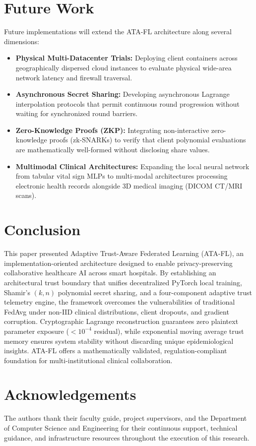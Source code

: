\documentclass[conference]{IEEEtran}
\begin{document}
\section{Future Work}
Future implementations will extend the ATA-FL architecture along several dimensions:
\begin{itemize}
    \item \textbf{Physical Multi-Datacenter Trials:} Deploying client containers across geographically dispersed cloud instances to evaluate physical wide-area network latency and firewall traversal.
    \item \textbf{Asynchronous Secret Sharing:} Developing asynchronous Lagrange interpolation protocols that permit continuous round progression without waiting for synchronized round barriers.
    \item \textbf{Zero-Knowledge Proofs (ZKP):} Integrating non-interactive zero-knowledge proofs (zk-SNARKs) to verify that client polynomial evaluations are mathematically well-formed without disclosing share values.
    \item \textbf{Multimodal Clinical Architectures:} Expanding the local neural network from tabular vital sign MLPs to multi-modal architectures processing electronic health records alongside 3D medical imaging (DICOM CT/MRI scans).
\end{itemize}

\section{Conclusion}
This paper presented Adaptive Trust-Aware Federated Learning (ATA-FL), an implementation-oriented architecture designed to enable privacy-preserving collaborative healthcare AI across smart hospitals. By establishing an architectural trust boundary that unifies decentralized PyTorch local training, Shamir's $(k, n)$ polynomial secret sharing, and a four-component adaptive trust telemetry engine, the framework overcomes the vulnerabilities of traditional FedAvg under non-IID clinical distributions, client dropouts, and gradient corruption. Cryptographic Lagrange reconstruction guarantees zero plaintext parameter exposure ($< 10^{-4}$ residual), while exponential moving average trust memory ensures system stability without discarding unique epidemiological insights. ATA-FL offers a mathematically validated, regulation-compliant foundation for multi-institutional clinical collaboration.

\section*{Acknowledgements}
The authors thank their faculty guide, project supervisors, and the Department of Computer Science and Engineering for their continuous support, technical guidance, and infrastructure resources throughout the execution of this research.



\end{document}
